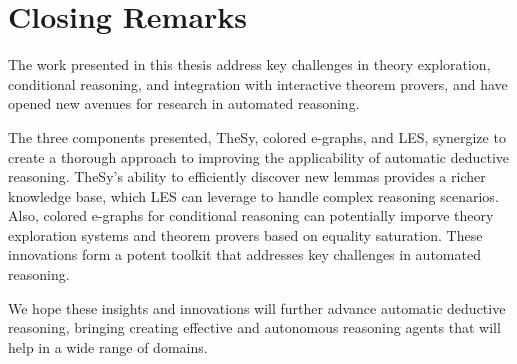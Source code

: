 \section{Closing Remarks}

The work presented in this thesis address key challenges in theory exploration, conditional reasoning, and integration with interactive theorem provers, and have opened new avenues for research in automated reasoning.

The three components presented, TheSy, colored e-graphs, and LES, synergize to create a thorough approach to improving the applicability of automatic deductive reasoning.
TheSy's ability to efficiently discover new lemmas provides a richer knowledge base, which LES can leverage to handle complex reasoning scenarios.
Also, colored e-graphs for conditional reasoning can potentially imporve theory exploration systems and theorem provers based on equality saturation. 
These innovations form a potent toolkit that addresses key challenges in automated reasoning.

We hope these insights and innovations will further advance automatic deductive reasoning, bringing creating effective and autonomous reasoning agents that will help in a wide range of domains.